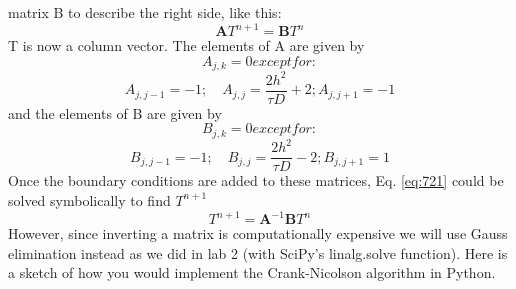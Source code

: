 matrix B to describe the right side, like this:
\begin{equation}\label{eq:721}
\mathbf{A} T^{n+1}=\mathbf{B} T^{n}
\end{equation}
T is now a column vector. The elements of A are given by\\
\begin{equation*}
A_{j, k}=0 except for : 
\end{equation*}
\begin{equation}\label{eq:722}
A_{j, j-1}=-1 ; \quad A_{j, j}=\frac{2 h^{2}}{\tau D}+2 ; A_{j, j+1}=-1
\end{equation}
and the elements of B are given by
\begin{equation*}
B_{j, k}=0 except for : 
\end{equation*}
\begin{equation}\label{eq:723}
B_{j, j-1}=-1 ; \quad B_{j, j}=\frac{2 h^{2}}{\tau D}-2 ; B_{j, j+1}=1
\end{equation}
Once the boundary conditions are added to these matrices, Eq. \eqref{eq:721} could be
solved symbolically to find $T^{n+1}$
\begin{equation}\label{eq:724}
T^{n+1}=\mathbf{A}^{-1} \mathbf{B} T^{n}
\end{equation}
However, since inverting a matrix is computationally expensive we will use Gauss
elimination instead as we did in lab 2 (with SciPy\rq s linalg.solve function). Here
is a sketch of how you would implement the Crank-Nicolson algorithm in Python.
